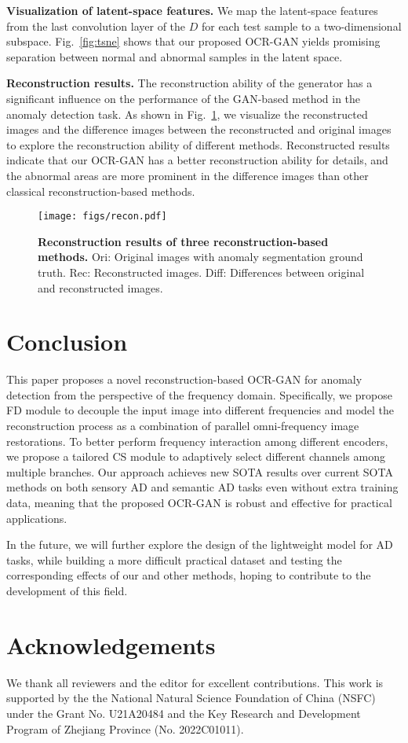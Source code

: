 \documentclass[lettersize,journal]{IEEEtran}
\begin{document}
\noindent\textbf{Visualization of latent-space features. }
We map the latent-space features from the last convolution layer of the $D$ for each test sample to a two-dimensional subspace. Fig.~\ref{fig:tsne} shows that our proposed OCR-GAN yields promising separation between normal and abnormal samples in the latent space.

\noindent\textbf{Reconstruction results. }
The reconstruction ability of the generator has a significant influence on the performance of the GAN-based method in the anomaly detection task. As shown in Fig.~\ref{fig:recon}, we visualize the reconstructed images and the difference images between the reconstructed and original images to explore the reconstruction ability of different methods. Reconstructed results indicate that our OCR-GAN has a better reconstruction ability for details, and the abnormal areas are more prominent in the difference images than other classical reconstruction-based methods.

 \begin{figure}[tp]
	\centering
	\texttt{[image: figs/recon.pdf]}
	\caption{\textbf{Reconstruction results of three reconstruction-based methods.} Ori: Original images with anomaly segmentation ground truth. Rec: Reconstructed images. Diff: Differences between original and reconstructed images.}
	\vspace{-0.5em}
	\label{fig:recon}
\end{figure}

\section{Conclusion}\label{sec:conclusion}
This paper proposes a novel reconstruction-based OCR-GAN for anomaly detection from the perspective of the frequency domain. Specifically, we propose FD module to decouple the input image into different frequencies and model the reconstruction process as a combination of parallel omni-frequency image restorations. To better perform frequency interaction among different encoders, we propose a tailored CS module to adaptively select different channels among multiple branches. Our approach achieves new SOTA results over current SOTA methods on both sensory AD and semantic AD tasks even without extra training data, meaning that the proposed OCR-GAN is robust and effective for practical applications. 

In the future, we will further explore the design of the lightweight model for AD tasks, while building a more difficult practical dataset and testing the corresponding effects of our and other methods, hoping to contribute to the development of this field.

\section*{Acknowledgements}\label{sec:acknowledgements}
We thank all reviewers and the editor for excellent contributions. This work is supported by the the National Natural Science Foundation of China (NSFC) under the Grant No. U21A20484 and the Key Research and Development Program of Zhejiang Province (No. 2022C01011).



\end{document}
